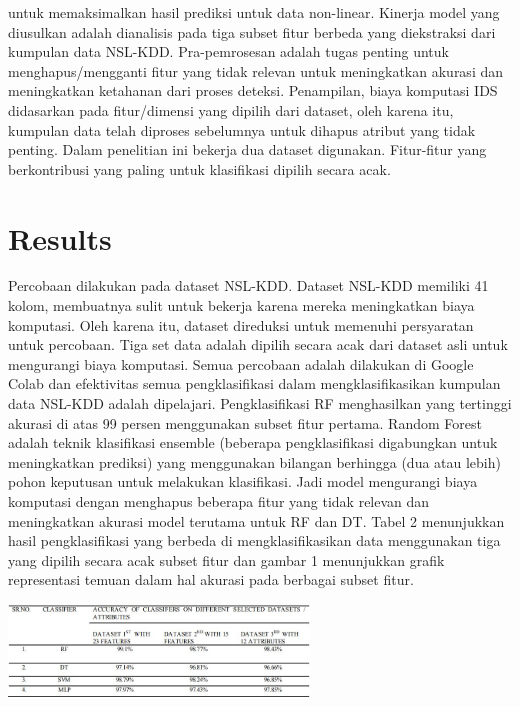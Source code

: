 \documentclass[conference]{IEEEtran}
\begin{document}
untuk memaksimalkan hasil prediksi untuk data non-linear. Kinerja model yang diusulkan adalah dianalisis pada tiga subset fitur berbeda yang diekstraksi dari kumpulan data NSL-KDD. Pra-pemrosesan adalah tugas penting untuk menghapus/mengganti fitur yang tidak relevan untuk meningkatkan akurasi dan meningkatkan ketahanan dari proses deteksi. Penampilan, biaya komputasi IDS didasarkan pada fitur/dimensi yang dipilih dari dataset, oleh karena itu, kumpulan data telah diproses sebelumnya untuk dihapus atribut yang tidak penting. Dalam penelitian ini bekerja dua dataset digunakan. Fitur-fitur yang berkontribusi yang paling untuk klasifikasi dipilih secara acak.

\section{Results}
Percobaan dilakukan pada dataset NSL-KDD. Dataset NSL-KDD memiliki 41 kolom, membuatnya sulit untuk bekerja karena mereka meningkatkan biaya komputasi. Oleh karena itu, dataset direduksi untuk memenuhi persyaratan untuk percobaan. Tiga set data adalah dipilih secara acak dari dataset asli untuk mengurangi biaya komputasi. Semua percobaan adalah dilakukan di Google Colab dan efektivitas semua pengklasifikasi dalam mengklasifikasikan kumpulan data NSL-KDD adalah dipelajari. Pengklasifikasi RF menghasilkan yang tertinggi akurasi di atas 99 persen menggunakan subset fitur pertama. Random Forest adalah teknik klasifikasi ensemble (beberapa pengklasifikasi digabungkan untuk meningkatkan prediksi) yang menggunakan bilangan berhingga (dua atau lebih) pohon keputusan untuk melakukan klasifikasi. Jadi model mengurangi biaya komputasi dengan menghapus beberapa fitur yang tidak relevan dan meningkatkan akurasi model terutama untuk RF dan DT. Tabel 2 menunjukkan hasil pengklasifikasi yang berbeda di mengklasifikasikan data menggunakan tiga yang dipilih secara acak subset fitur dan gambar 1 menunjukkan grafik representasi temuan dalam hal akurasi pada berbagai subset fitur.

\begin{minipage}{\linewidth}
\centerline{\includegraphics[width=80mm]{Gambar/gambar2.JPG}}
\label{fig2}
\end{minipage}
\end{document}
